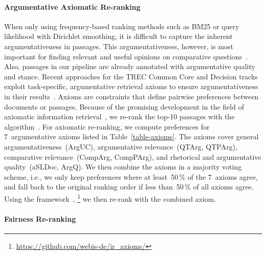 \paragraph{Argumentative Axiomatic Re-ranking}

When only using frequency-based ranking methods such as BM25 or query likelihood with Dirichlet smoothing, it is difficult to capture the inherent argumentativeness in passages.
This argumentativeness, however, is most important for finding relevant and useful opinions on comparative questions~\cite{BondarenkoFKSGBPBSWPH2022}.
Also, passages in our pipeline are already annotated with argumentative quality and stance.
Recent approaches for the TREC Common Core and Decision tracks exploit task-specific, argumentative retrieval axioms to ensure argumentativeness in their results~\cite{BondarenkoHVSPB2018,BondarenkoFKHVS2019}.
Axioms are constraints that define pairwise preferences between documents or passages.
Because of the promising development in the field of axiomatic information retrieval~\cite{BondarenkoFRSVH2022}, we re-rank the top-10 passages with the \KwikSort algorithm~\cite{HagenVGS2016}.
For axiomatic re-ranking, we compute preferences for 7~argumentative axioms listed in Table~\ref{table-axioms}.
The axioms cover general argumentativeness~(ArgUC), argumentative relevance~(QTArg, QTPArg), comparative relevance~(CompArg, CompPArg), and rhetorical and argumentative quality~(aSLDoc, ArgQ).
We then combine the axioms in a majority voting scheme, i.e., we only keep preferences where at least~50\,\% of the 7~axioms agree, and fall back to the original ranking order if less than~50\,\% of all axioms agree.
Using the \iraxioms framework~\cite{BondarenkoFRSVH2022},%
\footnote{\url{https://github.com/webis-de/ir_axioms/}} we then re-rank with the combined axiom.

\paragraph{Fairness Re-ranking}

